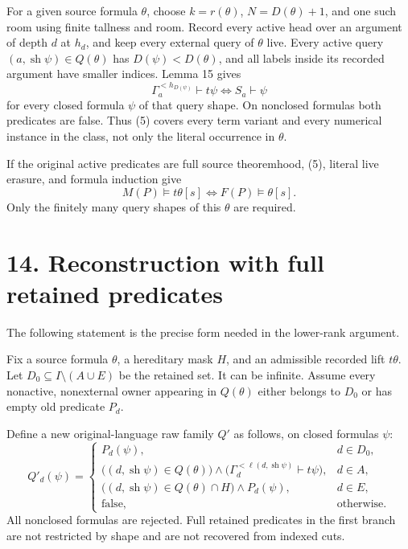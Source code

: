 \documentclass[
  11pt,
  letterpaper,
]{article}
\newcounter{none} %
\begin{document}
For a given source formula \(\theta\), choose \(k=r(\theta)\),
\(N=D(\theta)+1\), and one such room using finite tallness and room.
Record every active head over an argument of depth \(d\) at \(h_d\), and
keep every external query of \(\theta\) live. Every active query
\((a,\operatorname{sh}\psi)\in Q(\theta)\) has \(D(\psi)<D(\theta)\),
and all labels inside its recorded argument have smaller indices. Lemma
15 gives \[
\Gamma_a^{<h_{D(\psi)}}\vdash t\psi
\iff S_a\vdash\psi
\tag{5}
\] for every closed formula \(\psi\) of that query shape. On nonclosed
formulas both predicates are false. Thus (5) covers every term variant
and every numerical instance in the class, not only the literal
occurrence in \(\theta\).

If the original active predicates are full source theoremhood, (5),
literal live erasure, and formula induction give \[
M(P)\models t\theta[s]\iff F(P)\models\theta[s].
\tag{6}
\] Only the finitely many query shapes of this \(\theta\) are required.

\section{14. Reconstruction with full retained
predicates}\label{reconstruction-with-full-retained-predicates}

The following statement is the precise form needed in the lower-rank
argument.

Fix a source formula \(\theta\), a hereditary mask \(H\), and an
admissible recorded lift \(t\theta\). Let
\(D_0\subseteq I\setminus(A\cup E)\) be the retained set. It can be
infinite. Assume every nonactive, nonexternal owner appearing in
\(Q(\theta)\) either belongs to \(D_0\) or has empty old predicate
\(P_d\).

Define a new original-language raw family \(Q'\) as follows, on closed
formulas \(\psi\): \[
Q'_d(\psi)=
\begin{cases}
P_d(\psi),&d\in D_0,\\
\bigl((d,\operatorname{sh}\psi)\in Q(\theta)\bigr)
\land\bigl(\Gamma_d^{<\ell(d,\operatorname{sh}\psi)}\vdash t\psi\bigr),
&d\in A,\\
\bigl((d,\operatorname{sh}\psi)\in Q(\theta)\cap H\bigr)\land P_d(\psi),
&d\in E,\\
\text{false},&\text{otherwise}.
\end{cases}
\tag{7}
\] All nonclosed formulas are rejected. Full retained predicates in the
first branch are not restricted by shape and are not recovered from
indexed cuts.
\end{document}
